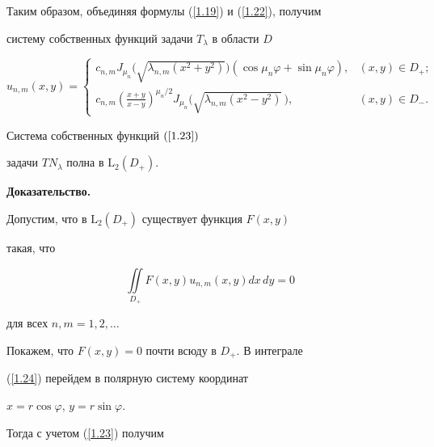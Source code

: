 Таким образом, объединяя формулы (\ref{1.19}) и (\ref{1.22}), получим 


систему собственных функций задачи $T_\lambda$ в области $D$


\begin{equation}


u_{n,m}(x,y)=


\begin{cases}


c_{n,m}J_{\mu_n}\big(\sqrt{\lambda_{n,m}(x^2+y^2)}\big)(\cos\mu_n\varphi+


\sin\mu_n\varphi), & (x,y)\in D_+;\\[3mm]


\displaystyle{c_{n,m}\left(\frac{x+y}{x-y}\right)^{\mu_n/2}J_{\mu_n}


\big(\sqrt{\lambda_{n,m}(x^2-y^2)}\,\big)}, & (x,y)\in D_-.


\end{cases}\label{1.23}


\end{equation}





\begin{thm}


Система собственных функций $(\ref{1.23})$


задачи $TN_\lambda$ полна в ${\mathrm L}_2(D_+)$.


\end{thm}





{\bf Доказательство.}


Допустим, что в ${\mathrm L}_2(D_+)$ существует функция $F(x,y)$


такая, что


\begin{equation}


\iint\limits_{D_+} F(x,y)u_{n,m}(x,y)dx\,dy=0 \label{1.24}


\end{equation}


для всех $n,m=1,2,\dotsc$


Покажем, что $F(x,y)=0$ почти всюду в $D_+$. В интеграле 


(\ref{1.24}) перейдем в полярную систему координат


$x=r\cos\varphi$, $y=r\sin\varphi$.


Тогда с учетом (\ref{1.23}) получим



